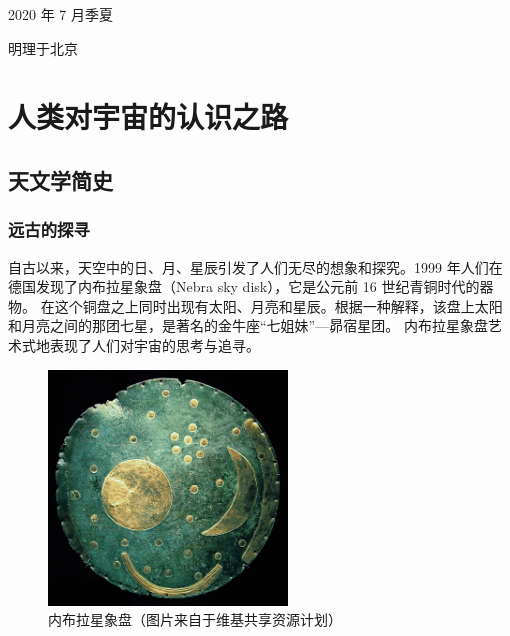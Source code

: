 \documentclass[a4paper,10.5pt]{book}
\begin{document}
\hfill \hfill 2020 年 7 月季夏

\hfill \hfill 明理于北京

\newpage

\setlength{\parindent}{0em}
\setlength{\parskip}{0em}

\renewcommand\contentsname{目录}
\tableofcontents
\thispagestyle{empty}

\newpage

\setcounter{page}{1} %

\setlength{\parindent}{0em}
\setlength{\parskip}{1.2em}

\chapter{人类对宇宙的认识之路}

\section{天文学简史}

\subsection{远古的探寻}

自古以来，天空中的日、月、星辰引发了人们无尽的想象和探究。1999 年人们在德国发现了内布拉星象盘（Nebra sky disk），它是公元前 16 世纪青铜时代的器物。
在这个铜盘之上同时出现有太阳、月亮和星辰。根据一种解释，该盘上太阳和月亮之间的那团七星，是著名的金牛座“七姐妹”—昴宿星团。
内布拉星象盘艺术式地表现了人们对宇宙的思考与追寻。\cite{pasztor2007interpretation}

\begin{figure}[ht]
\centering
\includegraphics[width=2.5in]{images/1_01-Nebra_sky_disk.jpg}
\caption{内布拉星象盘（图片来自于维基共享资源计划）}
\end{figure}
\end{document}
